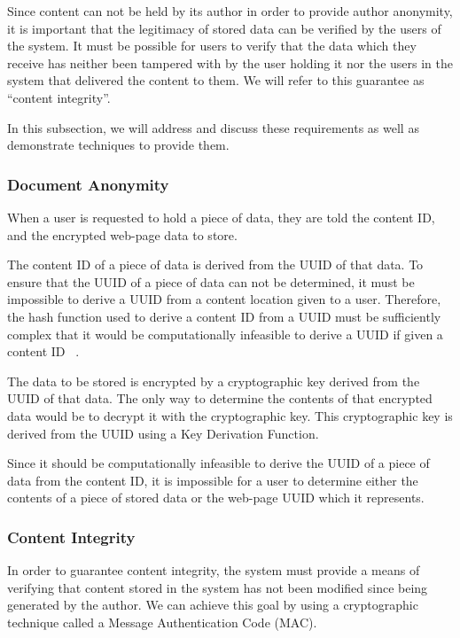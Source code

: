 Since content can not be held by its author in order to provide author anonymity, it is important that the legitimacy of stored
data can be verified by the users of the system. It must be possible for users to verify that the data which they receive has
neither been tampered with by the user holding it nor the users in the system that delivered the content to them.
We will refer to this guarantee as ``content integrity''.

In this subsection, we will address and discuss these requirements as well as demonstrate techniques to provide them.

\subsubsection{Document Anonymity}

When a user is requested to hold a piece of data, they are told the content ID, and the encrypted web-page data to store.

The content ID of a piece of data is derived from the UUID of that data. To ensure that the UUID of a piece of data
can not be determined, it must be impossible to derive a UUID from a content location given to a user.
Therefore, the hash function used to derive a content ID from a UUID must be sufficiently complex that it would be
computationally infeasible to derive a UUID if given a content ID ~\cite{sha1}.

The data to be stored is encrypted by a cryptographic key derived from the UUID of that data. The only way to determine
the contents of that encrypted data would be to decrypt it with the cryptographic key.
This cryptographic key is derived from the UUID using a Key Derivation Function.

Since it should be computationally infeasible to derive the UUID of a piece of data from the content ID, it is impossible
for a user to determine either the contents of a piece of stored data or the web-page UUID which it represents.

\subsubsection{Content Integrity}

In order to guarantee content integrity, the system must provide a means of verifying that content stored in the system
has not been modified since being generated by the author. We can achieve this goal by using a cryptographic
technique called a Message Authentication Code (MAC).

